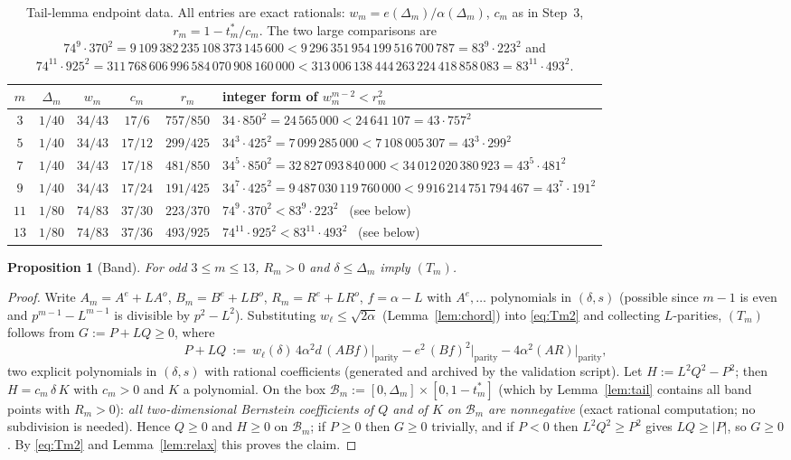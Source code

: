\documentclass[11pt]{amsart}
\newtheorem{proposition}[theorem]{Proposition}
\begin{document}
\begin{table}\centering
\small
\begin{tabular}{cccccl}\toprule
$m$&$\Delta_m$&$w_m$&$c_m$&$r_m$&integer form of $w_m^{m-2}<r_m^2$\\\midrule
$3$&$1/40$&$34/43$&$17/6$&$757/850$&$34\cdot850^2=24\,565\,000<24\,641\,107=43\cdot757^2$\\
$5$&$1/40$&$34/43$&$17/12$&$299/425$&$34^3\!\cdot\!425^2=7\,099\,285\,000<7\,108\,005\,307=43^3\!\cdot\!299^2$\\
$7$&$1/40$&$34/43$&$17/18$&$481/850$&$34^5\!\cdot\!850^2=32\,827\,093\,840\,000<34\,012\,020\,380\,923=43^5\!\cdot\!481^2$\\
$9$&$1/40$&$34/43$&$17/24$&$191/425$&$34^7\!\cdot\!425^2=9\,487\,030\,119\,760\,000<9\,916\,214\,751\,794\,467=43^7\!\cdot\!191^2$\\
$11$&$1/80$&$74/83$&$37/30$&$223/370$&$74^9\!\cdot\!370^2<83^9\!\cdot\!223^2$ \ (see below)\\
$13$&$1/80$&$74/83$&$37/36$&$493/925$&$74^{11}\!\cdot\!925^2<83^{11}\!\cdot\!493^2$ \ (see below)\\
\bottomrule
\end{tabular}
\caption{Tail-lemma endpoint data.  All entries are exact rationals:
$w_m=e(\Delta_m)/\alpha(\Delta_m)$, $c_m$ as in Step~3, $r_m=1-t^*_m/c_m$.
The two large comparisons are
$74^9\cdot370^2=9\,109\,382\,235\,108\,373\,145\,600
<9\,296\,351\,954\,199\,516\,700\,787=83^9\cdot223^2$ and
$74^{11}\cdot925^2=311\,768\,606\,996\,584\,070\,908\,160\,000
<313\,006\,138\,444\,263\,224\,418\,858\,083=83^{11}\cdot493^2$.}
\label{tab:tailints}
\end{table}

\begin{proposition}[Band]\label{prop:band}
For odd $3\le m\le13$, $R_m>0$ and $\delta\le\Delta_m$ imply $(T_m)$.
\end{proposition}

\begin{proof}
Write $A_m=A^e+LA^o$, $B_m=B^e+LB^o$, $R_m=R^e+LR^o$, $f=\alpha-L$ with
$A^e,\dots$ polynomials in $(\delta,s)$ (possible since $m-1$ is even and
$p^{m-1}-L^{m-1}$ is divisible by $p^2-L^2$).  Substituting
$w_\ell\le\sqrt{2\alpha}$ (Lemma~\ref{lem:chord}) into \eqref{eq:Tm2} and
collecting $L$-parities, $(T_m)$ follows from $G:=P+LQ\ge0$, where
\[
 P+LQ\ :=\ w_\ell(\delta)\,4\alpha^2d\,(A B f)\big|_{\text{parity}}
 -e^2\,(B f)^2\big|_{\text{parity}}-4\alpha^2 (A R)\big|_{\text{parity}},
\]
two explicit polynomials in $(\delta,s)$ with rational coefficients
(generated and archived by the validation script).  Let
$H:=L^2Q^2-P^2$; then $H=c_m\,\delta\,K$ with $c_m>0$ and $K$ a polynomial.
On the box $\mathcal B_m:=[0,\Delta_m]\times[0,1-t^*_m]$ (which by
Lemma~\ref{lem:tail} contains all band points with $R_m>0$):
\emph{all two-dimensional Bernstein coefficients of $Q$ and of $K$ on
$\mathcal B_m$ are nonnegative} (exact rational computation; no subdivision
is needed).  Hence $Q\ge0$ and $H\ge0$ on $\mathcal B_m$; if $P\ge0$ then
$G\ge0$ trivially, and if $P<0$ then $L^2Q^2\ge P^2$ gives $LQ\ge|P|$, so
$G\ge0$.  By \eqref{eq:Tm2} and Lemma~\ref{lem:relax} this proves the claim.
\end{proof}
\end{document}
